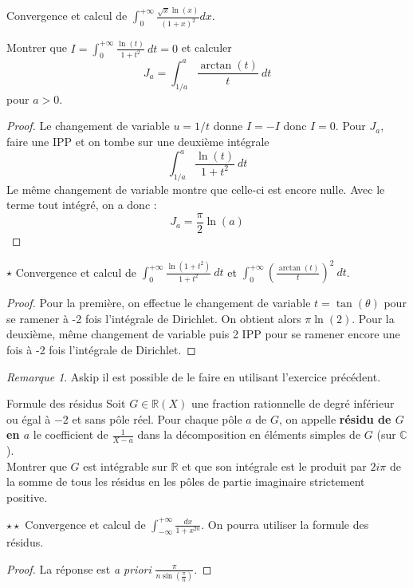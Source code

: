 \documentclass[french,a4paper]{article}
\newcommand{\R}{\mathbb{R}}
\newcommand{\C}{\mathbb{C}}
\theoremstyle{plain}
\theoremstyle{definition}
\theoremstyle{remark}
\newtheorem*{rmq}{Remarque}
\begin{document}
\begin{ex}[Moulin.IG.31]{}
	Convergence et calcul de $\displaystyle\int_{0}^{+\infty}\frac{\sqrt{x}\ln(x)}{(1+x)^2}dx$.
\end{ex}

\begin{ex}[Moulin.IG.32]{}
	Montrer que $\displaystyle I=\int_{0}^{+\infty}\frac{\ln(t)}{1+t^2}\ dt=0$ et calculer $$J_a=\int_{1/a}^{a}\frac{\arctan(t)}{t}\ dt$$ pour $a>0$.
\end{ex}
\begin{proof}
	Le changement de variable $u=1/t$ donne $I=-I$ donc $I=0$. Pour $J_a$, faire une IPP et on tombe sur une deuxième intégrale $$\int_{1/a}^{a}\frac{\ln(t)}{1+t^2}\ dt$$ Le même changement de variable montre que celle-ci est encore nulle. Avec le terme tout intégré, on a donc : $$J_a=\frac{\pi}{2}\ln(a)$$
\end{proof}

\begin{ex}[Moulin.IG.33]{$\star$}
	Convergence et calcul de $\displaystyle\int_{0}^{+\infty}\frac{\ln(1+t^2)}{1+t^2}\ dt$ et $\displaystyle\int_{0}^{+\infty}\left(\frac{\arctan(t)}{t}\right)^2 \ dt$.
\end{ex}
\begin{proof}
	Pour la première, on effectue le changement de variable $t=\tan(\theta)$ pour se ramener à -2 fois l'intégrale de Dirichlet. On obtient alors $\pi\ln(2)$. Pour la deuxième, même changement de variable puis 2 IPP pour se ramener encore une fois à -2 fois l'intégrale de Dirichlet.
\end{proof}
\begin{rmq}
	Askip il est possible de le faire en utilisant l'exercice précédent.
\end{rmq}

\begin{ex}[Moulin.IG.34]{Formule des résidus}
	Soit $G\in\R(X)$ une fraction rationnelle de degré inférieur ou égal à $-2$ et sans pôle réel. Pour chaque pôle $a$ de $G$, on appelle \textbf{résidu de $G$ en $a$} le coefficient de $\displaystyle\frac{1}{X-a}$ dans la décomposition en éléments simples de $G$ (sur $\C$). \\ Montrer que $G$ est intégrable sur $\R$ et que son intégrale est le produit par $2i\pi$ de la somme de tous les résidus en les pôles de partie imaginaire strictement positive.
\end{ex}

\begin{ex}[Moulin.IG.35]{$\star\star$}
	Convergence et calcul de $\displaystyle\int_{-\infty}^{+\infty}\frac{dx}{1+x^{2n}}$. On pourra utiliser la formule des résidus.
\end{ex}
\begin{proof}
	La réponse est \textit{a priori} $\displaystyle\frac{\pi}{n\sin\left(\frac{\pi}{n}\right)}$.
\end{proof}
\end{document}
